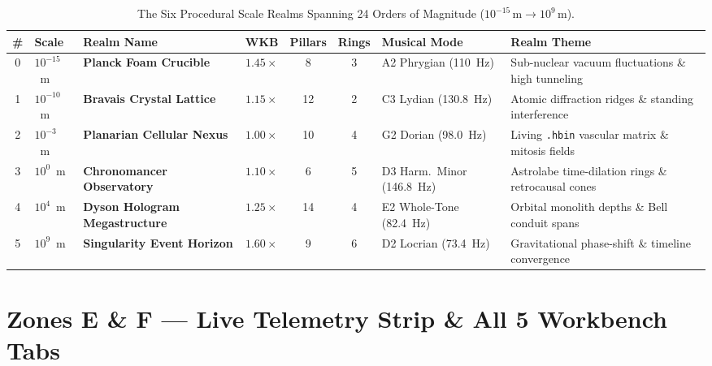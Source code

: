 \documentclass[10pt,letterpaper]{article}
\begin{document}
\begin{table}[ht]
\centering
\caption{The Six Procedural Scale Realms Spanning 24 Orders of Magnitude ($10^{-15}\,\text{m} \to 10^9\,\text{m}$).}
\label{tab:realms}
\footnotesize
\begin{tabularx}{\textwidth}{@{} c L{1.4cm} L{3.3cm} c c c L{2.4cm} Y @{}}
\toprule
\textbf{\#} & \textbf{Scale} & \textbf{Realm Name} & \textbf{WKB} & \textbf{Pillars} & \textbf{Rings} & \textbf{Musical Mode} & \textbf{Realm Theme} \\
 & $10^{-15}$~m & \textbf{Planck Foam Crucible} & $1.45\times$ & 8 & 3 & A2 Phrygian (110~Hz) & Sub-nuclear vacuum fluctuations \& high tunneling \\
1 & $10^{-10}$~m & \textbf{Bravais Crystal Lattice} & $1.15\times$ & 12 & 2 & C3 Lydian (130.8~Hz) & Atomic diffraction ridges \& standing interference \\
2 & $10^{-3}$~m & \textbf{Planarian Cellular Nexus} & $1.00\times$ & 10 & 4 & G2 Dorian (98.0~Hz) & Living \texttt{.hbin} vascular matrix \& mitosis fields \\
3 & $10^{0}$~m & \textbf{Chronomancer Observatory} & $1.10\times$ & 6 & 5 & D3 Harm.\ Minor (146.8~Hz) & Astrolabe time-dilation rings \& retrocausal cones \\
4 & $10^{4}$~m & \textbf{Dyson Hologram Megastructure} & $1.25\times$ & 14 & 4 & E2 Whole-Tone (82.4~Hz) & Orbital monolith depths \& Bell conduit spans \\
5 & $10^{9}$~m & \textbf{Singularity Event Horizon} & $1.60\times$ & 9 & 6 & D2 Locrian (73.4~Hz) & Gravitational phase-shift \& timeline convergence \\
\bottomrule
\end{tabularx}
\end{table}

\FloatBarrier
\section{Zones E \& F --- Live Telemetry Strip \& All 5 Workbench Tabs}
\label{sec:workbench}
\end{document}
